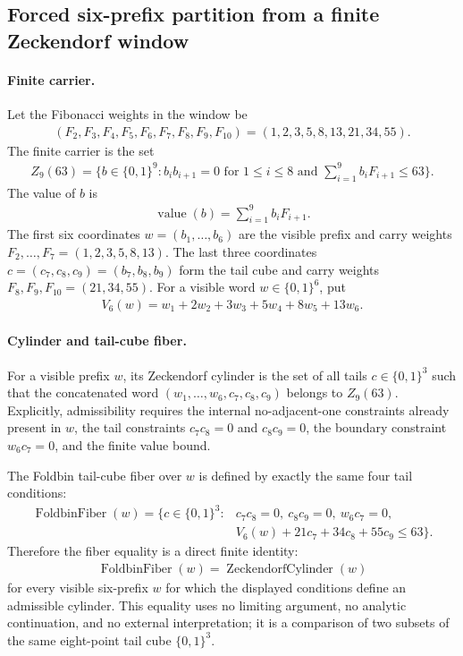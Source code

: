 
\subsection{Forced six-prefix partition from a finite Zeckendorf window}
\label{sec:window6-zeckendorf-cylinder-foldbin-partition-quotient}

\paragraph{Finite carrier.}
Let the Fibonacci weights in the window be
$$
\begin{aligned}
(F_2,F_3,F_4,F_5,F_6,F_7,F_8,F_9,F_{10})=(1,2,3,5,8,13,21,34,55).
\end{aligned}
$$
The finite carrier is the set
$$
\begin{aligned}
Z_9(63)=\{b\in \{0,1\}^9 : b_i b_{i+1}=0 \text{ for } 1\leq i\leq 8 \text{ and } \sum_{i=1}^{9} b_i F_{i+1}\leq 63\}.
\end{aligned}
$$
The value of $b$ is
$$
\begin{aligned}
\operatorname{value}(b)=\sum_{i=1}^{9} b_i F_{i+1}.
\end{aligned}
$$
The first six coordinates $w=(b_1,\ldots,b_6)$ are the visible prefix and carry weights $F_2,\ldots,F_7=(1,2,3,5,8,13)$. The last three coordinates $c=(c_7,c_8,c_9)=(b_7,b_8,b_9)$ form the tail cube and carry weights $F_8,F_9,F_{10}=(21,34,55)$. For a visible word $w\in\{0,1\}^6$, put
$$
\begin{aligned}
V_6(w)=w_1+2w_2+3w_3+5w_4+8w_5+13w_6.
\end{aligned}
$$

\paragraph{Cylinder and tail-cube fiber.}
For a visible prefix $w$, its Zeckendorf cylinder is the set of all tails $c\in\{0,1\}^3$ such that the concatenated word $(w_1,\ldots,w_6,c_7,c_8,c_9)$ belongs to $Z_9(63)$. Explicitly, admissibility requires the internal no-adjacent-one constraints already present in $w$, the tail constraints $c_7c_8=0$ and $c_8c_9=0$, the boundary constraint $w_6c_7=0$, and the finite value bound.

The Foldbin tail-cube fiber over $w$ is defined by exactly the same four tail conditions:
$$
\begin{aligned}
\operatorname{FoldbinFiber}(w)=\{c\in\{0,1\}^3 :{}& c_7c_8=0,\ c_8c_9=0,\ w_6c_7=0,\\
& V_6(w)+21c_7+34c_8+55c_9\leq 63\}.
\end{aligned}
$$
Therefore the fiber equality is a direct finite identity:
$$
\begin{aligned}
\operatorname{FoldbinFiber}(w)=\operatorname{ZeckendorfCylinder}(w)
\end{aligned}
$$
for every visible six-prefix $w$ for which the displayed conditions define an admissible cylinder. This equality uses no limiting argument, no analytic continuation, and no external interpretation; it is a comparison of two subsets of the same eight-point tail cube $\{0,1\}^3$.


